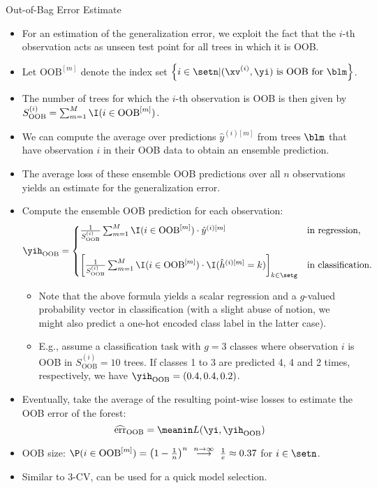 \documentclass[11pt,compress,t,notes=noshow, xcolor=table]{beamer}
\begin{document}
\begin{vbframe}{Out-of-Bag Error Estimate}
\begin{itemize}
  \item For an estimation of the generalization error, we exploit the 
  fact that the $i$-th observation acts as unseen test point for all trees in 
  which it is OOB. 
  \item Let $\text{OOB}^{[m]}$ denote the index set 
  $\left \{i \in \setn | (\xv^{(i)}, \yi) \text{ is OOB for } \blm \right \}$.
  \item The number of trees for which the $i$-th observation is OOB is then 
  given by $S_{\text{OOB}}^{(i)} = 
  \sum_{m = 1}^M \I(i \in \text{OOB}^{[m]})$.
  \item We can compute the average over predictions $\hat{y}^{(i)[m]}$ from 
  trees $\blm$ that have observation $i$ in their OOB data to obtain an 
  ensemble prediction.
  \item The average loss of these ensemble OOB predictions over all $n$ 
  observations yields an estimate for the generalization error.
  \item Compute the ensemble OOB prediction for each observation:
  $$\yih_{\text{OOB}} = \begin{cases}
  \frac{1}{S_{\text{OOB}}^{(i)}} \sum_{m = 1}^{M} 
  \I(i \in \text{OOB}^{[m]}) \cdot \hat{y}^{(i)[m]}
  & \text{in regression,} 
  \\ \phantom{x} \\
  \left[
  \frac{1}{S_{\text{OOB}}^{(i)}} \sum_{m = 1}^{M} \I(i \in \text{OOB}^{[m]}) 
  \cdot \I(\hat{h}^{(i)[m]} = k) \right]_{k \in \setg} &
  \text{in classification.}
  \end{cases}$$
  \begin{itemize}
    \footnotesize
    \item Note that the above formula yields a scalar regression and 
    a $g$-valued probability vector in classification (with a 
    slight abuse of notion, we might also predict a one-hot encoded class label 
    in the latter case).
    \item E.g., assume a classification task with $g = 3$ classes where 
    observation $i$ is OOB in $S_{\text{OOB}}^{(i)} = 10$ trees. If classes 1 to 
    3 are predicted 4, 4 and 2 times, respectively, we have 
    $\yih_{\text{OOB}} = (0.4, 0.4, 0.2)$.
  \end{itemize}
  \item Eventually, take the average of the resulting point-wise losses to 
  estimate the OOB error of the forest:
  $$\widehat{\text{err}}_{\text{OOB}} = \meanin L(\yi, \yih_{\text{OOB}})$$
  \item OOB size: $\P(i \in \text{OOB}^{[m]}) = \left(1 - \frac{1}{n}\right)^n 
  \ \stackrel{n \to \infty}{\longrightarrow} \ \frac{1}{e} \approx 0.37$ for 
  $i \in \setn$.
  \item Similar to 3-CV, can be used for a quick model selection.
\end{itemize}



\end{vbframe}

\endlecture
\end{document}
